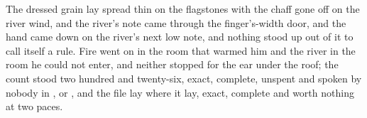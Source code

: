 The dressed grain lay spread thin on the flagstones with the chaff gone off on the river wind, and the river's note came through the finger's-width door, and the hand came down on the river's next low note, and nothing stood up out of it to call itself a rule. Fire went on in the room that warmed him and the river in the room he could not enter, and neither stopped for the ear under the roof; the count stood two hundred and twenty-six, exact, complete, unspent and spoken by nobody in ,  or , and the file lay where it lay, exact, complete and worth nothing at two paces.
